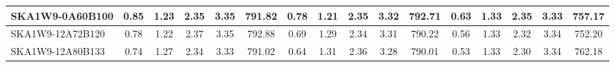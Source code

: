 \begin{table}[H]
{{\begin{tabular}{|lccccc||ccccc||ccccc|}
SKA1W9-0A60B100 & 0.85 \cellcolor{blue!56.51} & 1.23 \cellcolor{red!19.21} & 2.35 \cellcolor{green!39.38} & 3.35 \cellcolor{orange!34.76} & 791.82 \cellcolor{purple!33.19} & 0.78 \cellcolor{blue!53.08} & 1.21 \cellcolor{red!18.00} & 2.35 \cellcolor{green!37.15} & 3.32 \cellcolor{orange!38.82} & 792.71 \cellcolor{purple!60.00} & 0.63 \cellcolor{blue!46.07} & 1.33 \cellcolor{red!53.74} & 2.35 \cellcolor{green!60.00} & 3.33 \cellcolor{orange!18.00} & 757.17 \cellcolor{purple!38.75}\\ \hline 
SKA1W9-12A72B120 & 0.78 \cellcolor{blue!43.43} & 1.22 \cellcolor{red!18.00} & 2.37 \cellcolor{green!60.00} & 3.35 \cellcolor{orange!39.11} & 792.88 \cellcolor{purple!38.36} & 0.69 \cellcolor{blue!37.03} & 1.29 \cellcolor{red!45.76} & 2.34 \cellcolor{green!18.00} & 3.31 \cellcolor{orange!34.88} & 790.22 \cellcolor{purple!21.23} & 0.56 \cellcolor{blue!25.14} & 1.33 \cellcolor{red!60.00} & 2.32 \cellcolor{green!32.00} & 3.34 \cellcolor{orange!45.26} & 752.20 \cellcolor{purple!18.00}\\ \hline 
SKA1W9-12A80B133 & 0.74 \cellcolor{blue!35.36} & 1.27 \cellcolor{red!33.64} & 2.34 \cellcolor{green!28.37} & 3.33 \cellcolor{orange!18.00} & 791.02 \cellcolor{purple!29.27} & 0.64 \cellcolor{blue!26.86} & 1.31 \cellcolor{red!54.25} & 2.36 \cellcolor{green!52.78} & 3.28 \cellcolor{orange!18.00} & 790.01 \cellcolor{purple!18.00} & 0.53 \cellcolor{blue!18.00} & 1.33 \cellcolor{red!51.03} & 2.30 \cellcolor{green!18.00} & 3.34 \cellcolor{orange!41.64} & 762.18 \cellcolor{purple!59.66}\\ \hline 
\end{tabular}}
\vspace{-0.300000cm}
\hspace{1cm} 
}
\end{table}
